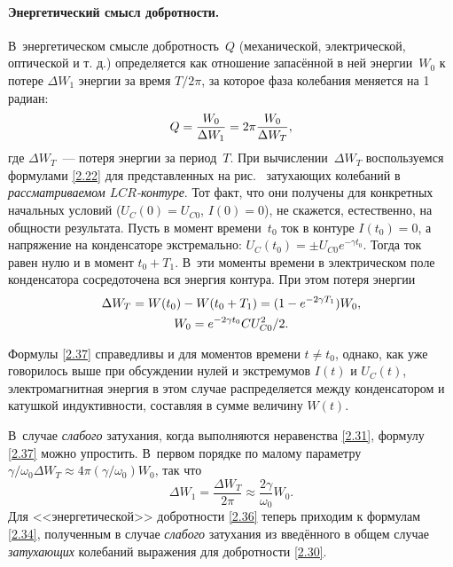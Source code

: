 \documentclass[a4paper,oneside]{book}
\begin{document}
\paragraph{Энергетический смысл добротности.}
В~энергетическом смысле добротность~$Q$ 
(механической, электрической, оптической и т. д.) определяется как отношение
запасённой в ней энергии~$W_0$ к потере $\Delta W_1$ энергии за время $T/2\pi$, за
которое фаза колебания меняется на 1 радиан:
\begin{equation}\eqmark{2.36}
Q=\dfrac{W_0}{\Delta W_1}=2\pi\dfrac{W_0}{\Delta W_T},
\end{equation}
где  $\Delta W_T$~--- потеря энергии за период~$T$.
При вычислении~$\Delta W_T$
воспользуемся формулами \eqref{2.22} для представленных на рис.~
затухающих колебаний в \emph{рассматриваемом $LCR$-контуре}. Тот факт, что
они получены для конкретных начальных условий ($U_C(0)=U_{C0}$, $I(0)=0$),
не скажется, естественно, на общности результата. Пусть в момент времени~$t_0$ ток
в контуре $I(t_0)=0$, а напряжение на конденсаторе экстремально: $U_C(t_0)=\pm
U_{C0}e^{-\gamma t_0}$. Тогда ток равен нулю и в момент $t_0+T_1$. В~эти моменты
времени в электрическом поле конденсатора сосредоточена вся энергия контура. При
этом потеря энергии
\begin{equation}
	\eqmark{2.37}
		\begin{gathered}[c]
			 \Delta W_T = W(t_0)-W(t_0+T_1)=(1-e^{-2\gamma T_1})W_0, \\
			 W_0 = e^{-2\gamma t_0}CU_{C0}^2/2.
		\end{gathered}
\end{equation}

Формулы \eqref{2.37} справедливы и для моментов времени $t\ne t_0$, однако, как
уже говорилось выше при обсуждении нулей и экстремумов $I(t)$ и $U_C(t)$,
электромагнитная энергия в этом случае распределяется между конденсатором и
катушкой индуктивности, составляя в сумме величину $W(t)$.

В~случае \emph{слабого} затухания, когда выполняются неравенства
\eqref{2.31}, формулу \eqref{2.37} можно упростить. В~первом порядке по малому
параметру $\gamma/\omega_0 \Delta W_T\approx 4\pi(\gamma/\omega_0)W_0$, так что
\begin{equation*}
\Delta W_1=\frac{\Delta W_T}{2\pi}\approx \frac{2\gamma}{\omega_0}W_0.
\end{equation*}
Для <<энергетической>>
добротности \eqref{2.36} теперь приходим к формулам \eqref{2.34}, полученным в
случае \emph{слабого} затухания из введённого в общем случае
\emph{затухающих} колебаний выражения для добротности \eqref{2.30}.
\end{document}
